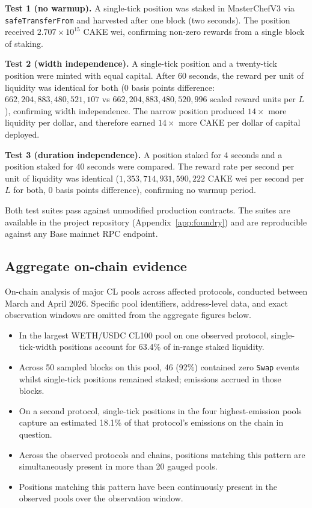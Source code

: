 \documentclass[11pt,a4paper]{article}
\theoremstyle{definition}
\begin{document}
\textbf{Test 1 (no warmup).} A single-tick position was staked in MasterChefV3 via \texttt{safeTransferFrom} and harvested after one block (two seconds). The position received $2.707 \times 10^{15}$ CAKE wei, confirming non-zero rewards from a single block of staking.

\textbf{Test 2 (width independence).} A single-tick position and a twenty-tick position were minted with equal capital. After 60 seconds, the reward per unit of liquidity was identical for both (0 basis points difference: $662{,}204{,}883{,}480{,}521{,}107$ vs $662{,}204{,}883{,}480{,}520{,}996$ scaled reward units per $L$), confirming width independence. The narrow position produced $14\times$ more liquidity per dollar, and therefore earned $14\times$ more CAKE per dollar of capital deployed.

\textbf{Test 3 (duration independence).} A position staked for 4 seconds and a position staked for 40 seconds were compared. The reward rate per second per unit of liquidity was identical ($1{,}353{,}714{,}931{,}590{,}222$ CAKE wei per second per $L$ for both, 0 basis points difference), confirming no warmup period.

Both test suites pass against unmodified production contracts. The suites are available in the project repository (Appendix~\ref{app:foundry}) and are reproducible against any Base mainnet RPC endpoint.

\subsection{Aggregate on-chain evidence}\label{sec:onchain}

On-chain analysis of major CL pools across affected protocols, conducted between March and April 2026. Specific pool identifiers, address-level data, and exact observation windows are omitted from the aggregate figures below.

\begin{itemize}[leftmargin=2em]
\item In the largest WETH/USDC CL100 pool on one observed protocol, single-tick-width positions account for 63.4\% of in-range staked liquidity.
\item Across 50 sampled blocks on this pool, 46 (92\%) contained zero \texttt{Swap} events whilst single-tick positions remained staked; emissions accrued in those blocks.
\item On a second protocol, single-tick positions in the four highest-emission pools capture an estimated 18.1\% of that protocol's emissions on the chain in question.
\item Across the observed protocols and chains, positions matching this pattern are simultaneously present in more than 20 gauged pools.
\item Positions matching this pattern have been continuously present in the observed pools over the observation window.
\end{itemize}
\end{document}
